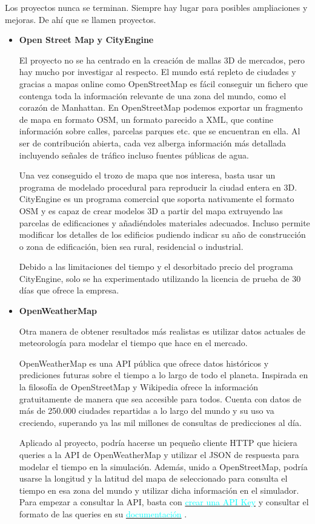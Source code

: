 \documentclass[12pt,a4paper,openright,oneside]{article}
\newcommand{\link}[2]
{ 
	\href{#2}{\textcolor{cyan}{#1}}
}
\numberwithin{equation}{section}
\theoremstyle{definition}
\begin{document}
Los proyectos nunca se terminan. Siempre hay lugar para posibles ampliaciones y mejoras. De ahí que se llamen proyectos. 
\begin{itemize}
\item \textbf{Open Street Map y CityEngine}

El proyecto no se ha centrado en la creación de mallas 3D de mercados, pero hay mucho por investigar al respecto. El mundo está repleto de ciudades y gracias a mapas online como OpenStreetMap es fácil conseguir un fichero que contenga toda la información relevante de una zona del mundo, como el corazón de Manhattan. En OpenStreetMap podemos exportar un fragmento de mapa en formato OSM, un formato parecido a XML, que contine información sobre calles, parcelas parques etc. que se encuentran en ella. Al ser de contribución abierta, cada vez alberga información más detallada incluyendo señales de tráfico incluso fuentes públicas de agua. 

Una vez conseguido el trozo de mapa que nos interesa, basta usar un programa de modelado procedural para reproducir la ciudad entera en 3D. CityEngine es un programa comercial que soporta nativamente el formato OSM y es capaz de crear modelos 3D a partir del mapa extruyendo las parcelas de edificaciones y añadiéndoles materiales adecuados. Incluso permite modificar los detalles de los edificios pudiendo indicar su año de construcción o zona de edificación, bien sea rural, residencial o industrial.

Debido a las limitaciones del tiempo y el desorbitado precio del programa CityEngine, solo se ha experimentado utilizando la licencia de prueba de 30 días que ofrece la empresa.

\item \textbf{OpenWeatherMap}

Otra manera de obtener resultados más realistas es utilizar datos actuales de meteorología para modelar el tiempo que hace en el mercado.

OpenWeatherMap es una API pública que ofrece datos históricos y prediciones futuras sobre el tiempo a lo largo de todo el planeta. Inspirada en la filosofía de OpenStreetMap y Wikipedia ofrece la información gratuitamente de manera que sea accesible para todos. Cuenta con datos de más de 250.000 ciudades repartidas a lo largo del mundo y su uso va creciendo, superando ya las mil millones de consultas de predicciones al día.

Aplicado al proyecto, podría hacerse un pequeño cliente HTTP que hiciera queries a la API de OpenWeatherMap y utilizar el JSON de respuesta para modelar el tiempo en la simulación. Además, unido a OpenStreetMap, podría usarse la longitud y la latitud del mapa de seleccionado para consulta el tiempo en esa zona del mundo y utilizar dicha información en el simulador. Para empezar a consultar la API, basta con \link{crear una API Key}{http://openweathermap.org/appid} y consultar el formato de las queries en su \link{documentación}{http://openweathermap.org/api}.


\end{itemize}
\end{document}
